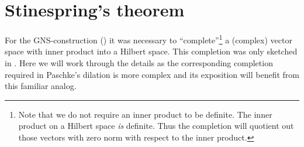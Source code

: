 \section{Stinespring's theorem}
\begin{parsec}%
\begin{point}%
For the GNS-construction ()
it was necessary to ``complete''\footnote{Note that
        we do not require an inner product to be definite.
    The inner product on a Hilbert space \emph{is} definite.
    Thus the completion will quotient out those vectors with
        zero norm with respect to the inner product.}
        a (complex) vector space with inner product into a Hilbert space.
This completion was only sketched in .
Here we will work through the details
    as the corresponding completion required
    in Paschke's dilation
    is more complex and its exposition will benefit
    from this familiar analog.
\end{point}


\end{parsec}
